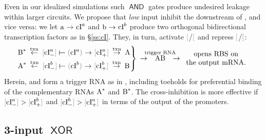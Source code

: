 \documentclass[12pt,notitlepage]{article}
\let\cite\citep
\newcommand{\AND}{\ensuremath{\mathop{\mathsf{AND}}}\xspace}
\newcommand{\XOR}{\ensuremath{\mathop{\mathsf{XOR}}}\xspace}
\newcommand{\cbra}[1]{{\ensuremath{\color{gray}{#1}}}}
\newcommand{\protein}[1]{{{\cbra{(}\ce{#1}\cbra{)}}}}
\newcommand{\promoter}[1]{{{\cbra{[}\ce{#1}\cbra{]}}}}
\newcommand{\act}{\ {\ensuremath{\mathbin{\to}}}\ }
\newcommand{\rep}{\ {\ensuremath{\mathrel{\raisebox{-.3ex}{\rotatebox{90}{\scalebox{1}[1.2]{$\bot$}}}}}}\ }
\begin{document}
Even in our idealized simulations
such \AND gates produce undesired leakage
within larger circuits.
%
%
%
We propose that
\emph{low} input  
{inhibit} the downstream of ,
and vice versa:
%
we let $\ce{a} \act \ce{cI^a}$
and
$\ce{b} \act \ce{cI^b}$
produce
two orthogonal 
bidirectional
transcription factors as in \S\ref{ss:cI}.
%
They, in turn, 
activate \promoter{cI^a_+}/\promoter{cI^b_+}
and 
repress \promoter{cI^a_-}/\promoter{cI^b_-}:
%
%
\begin{align}
    \begin{rcases*}
        \ce{B^*} 
        \stackrel{\text{txn}}{\reflectbox{\act}}
        \promoter{cI^a_-} \reflectbox{\rep} \protein{cI^a} \act \promoter{cI^a_+} 
        \stackrel{\text{txn}}{\act}
        \ce{A}
        \\
        \ce{A^*}
        \stackrel{\text{txn}}{\reflectbox{\act}}
        \promoter{cI^b_-} \reflectbox{\rep} \protein{cI^b} \act \promoter{cI^b_+} 
        \stackrel{\text{txn}}{\act}
        \ce{B}
    \end{rcases*}
    \act 
    \stackrel{\hspace{-10pt}\smash{\text{trigger RNA}}\hspace{-10pt}}{\ce{AB}}
    \act 
    \begin{array}{c}
        \text{opens RBS on} \\ \text{the output mRNA.}
    \end{array}
\end{align}
%
%
Herein,
 and  
form a trigger RNA  as in
\cite[\href{https://www.nature.com/articles/nature23271/figures/2}{Fig.~2e}]{GreenETAL2017},
including toeholds
for preferential binding 
of the complementary RNAs $\ce{A^*}$ and $\ce{B^*}$.
%
%
The cross-inhibition is more effective
if
$\promoter{cI^a_-} > \promoter{cI^b_+}$
and
$\promoter{cI^b_-} > \promoter{cI^a_+}$
in terms of the output of the promoters.
%
%





%


\subsection{3-input \texorpdfstring{\XOR}{XOR}} \label{ss:3xor}
\end{document}
